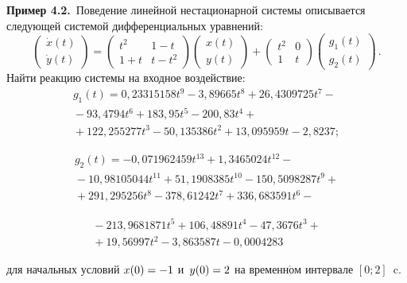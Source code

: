 \begin{multicols}{2}
\smallskip

\noindent
\textbf{Пример 4.2.}\
Поведение линейной нестационарной системы описывается следующей
 системой дифференциальных уравнений:
$$
\begin{pmatrix}
{\dot x}(t) \\ {\dot y}(t)\end{pmatrix} = 
\begin{pmatrix} t^2 & 1-t \\ 1+t & t-t^2 \end{pmatrix}
 \begin{pmatrix} {x}(t) \\ {y}(t)\end{pmatrix}
 +  
 \begin{pmatrix} t^2 & 0 \\ 1 & t \end{pmatrix} 
 \begin{pmatrix} {g}_1(t) \\ {g}_2(t)\end{pmatrix}\,.
$$
Найти реакцию системы на входное воздействие:
\begin{multline*}
g_1(t) = 0{,}23315158 t^9-3{,}89665 t^8+26{,}4309725 t^7{}-\\
{}-93{,}4794 t^6+183{,}95 t^5 -200{,}83 t^4+{}\\
{}+122{,}255277 t^3-50{,}135386 t^2+13{,}095959 t-2{,}8237;
\end{multline*}

\vspace*{-12pt}

\noindent
\begin{multline*}
g_2(t) = -0{,}071962459 t^{13}+1{,}3465024 t^{12}-{}\\
{}-10{,}98105044 t^{11} + 51{,}1908385 t^{10} - 150{,}5098287 t^9+{}\\
{}+291{,}295256 t^8-378{,}61242 t^7+336{,}683591 t^6-{}
\end{multline*}

\noindent
\begin{multline*}
{}-213{,}9681871 t^5 + 106{,}48891 t^4-47{,}3676 t^3+{}\\
{}+19{,}56997 t^2-3{,}863587 t-0{,}0004283
\end{multline*}


\noindent
для начальных условий $x(0)\hm=-1$ и~$y(0)\hm=2$ на вре\-мен\-н$\acute{\mbox{о}}$м интервале $[0;2]$~c.

\smallskip




\end{multicols}
